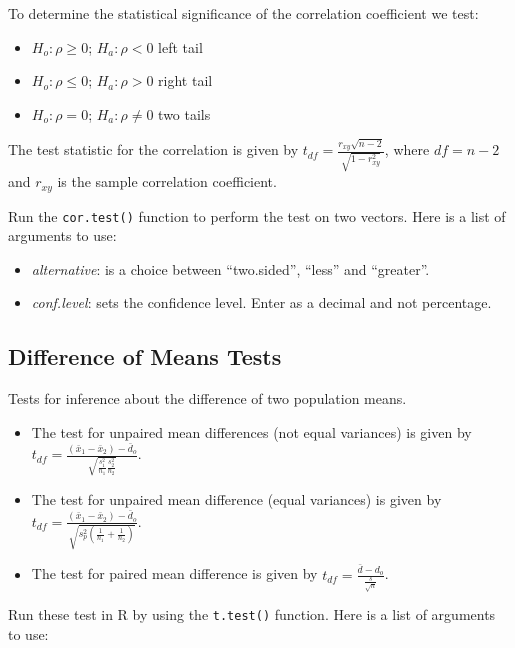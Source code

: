 \documentclass[
  letterpaper,
  DIV=11,
  numbers=noendperiod]{scrreprt}
\begin{document}
To determine the statistical significance of the correlation coefficient
we test:

\begin{itemize}
\item
  \(H_o: \rho \geq 0\); \(H_a: \rho <0\) left tail
\item
  \(H_o: \rho \leq 0\); \(H_a: \rho >0\) right tail
\item
  \(H_o: \rho = 0\); \(H_a: \rho \neq 0\) two tails
\end{itemize}

The test statistic for the correlation is given by
\(t_{df}= \frac{r_{xy}\sqrt{n-2}}{\sqrt{1-r_{xy}^2}}\), where \(df=n-2\)
and \(r_{xy}\) is the sample correlation coefficient.

Run the \texttt{cor.test()} function to perform the test on two vectors.
Here is a list of arguments to use:

\begin{itemize}
\item
  \emph{alternative}: is a choice between ``two.sided'', ``less'' and
  ``greater''.
\item
  \emph{conf.level}: sets the confidence level. Enter as a decimal and
  not percentage.
\end{itemize}

\hypertarget{difference-of-means-tests}{%
\subsection*{Difference of Means
Tests}\label{difference-of-means-tests}}

Tests for inference about the difference of two population means.

\begin{itemize}
\item
  The test for unpaired mean differences (not equal variances) is given
  by
  \(t_{df}= \frac {(\bar x_1 - \bar x_2)- \bar d_o}{\sqrt {\frac {s_1^2}{n_1} \frac{s_2^2}{n_2}}}\).
\item
  The test for unpaired mean difference (equal variances) is given by
  \(t_{df}= \frac {(\bar x_1 - \bar x_2)- \bar d_o}{\sqrt {s_p^2 (\frac {1}{n_1} + \frac {1}{n_2})}}\).
\item
  The test for paired mean difference is given by
  \(t_{df}= \frac {\bar d- d_o}{\frac {s}{\sqrt{n}}}\).
\end{itemize}

Run these test in R by using the \texttt{t.test()} function. Here is a
list of arguments to use:
\end{document}
